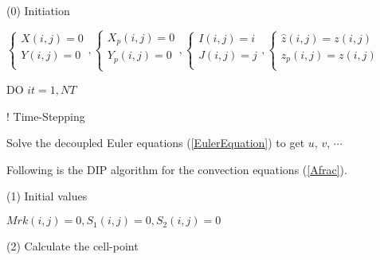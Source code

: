 \documentclass{article}
\theoremstyle{plain}\newtheorem{definition}{\sc{Definition}}
\theoremstyle{defination}\newtheorem{example}{Example}[section]
\numberwithin{equation}{section}
\numberwithin{table}{section}
\begin{document}
\hspace{-0.48cm}
\normalsize
(0) Initiation 
\vspace{0.1cm}

\hspace{0.5cm}
  \scriptsize{\color{black!80}
  \hspace{-0.7cm}
  $
  \left\{
  \begin{array}{l}
	X(i,j)=0\\
	Y(i,j)=0\\
	\end{array}
	\right.
,
\left\{
  \begin{array}{l}
	X_p(i,j)=0\\
	Y_p(i,j)=0\\
	\end{array}
	\right.
,
\left\{
  \begin{array}{l}
	I(i,j)=i\\
	J(i,j)=j\\
	\end{array}
	\right.
,
\left\{
  \begin{array}{l}
	\hat{z}(i,j)=z(i,j)\\
	z_p(i,j)=z(i,j)\\
	\end{array}
	\right.
$

\vspace{0.1cm}
\hspace{-0.48cm}
{ \color{black!60!blue!80}DO}
\color{black!80} $it=1,NT$} {\color{black!60} \hspace{2.3cm} ! Time-Stepping
  \color{black}

  \small \hspace{-0.0cm}
\hspace{-0.18cm}
Solve the decoupled Euler equations (\ref{EulerEquation}) to get $u$, $v$, $\cdots$

\hspace{-0.10cm}
Following is the DIP  algorithm for the convection equations (\ref{Afrac}).
\vspace{0.2cm}

 \normalsize (1) Initial values
  \scriptsize
  { \color{black!80}  
  \vspace{0.1cm}

  \hspace{0.5cm}
$
Mrk(i,j)=0,
S_1(i,j)=0,
S_2(i,j)=0
$
\vspace{0.1cm}

\normalsize \color{black}
(2) Calculate the cell-point
 \scriptsize 
 \vspace{0.1cm}

}}
\end{document}
